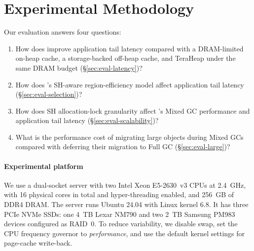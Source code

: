 \section{Experimental Methodology}
\label{chipper:sec:methodology}

Our evaluation answers four questions:

\begin{enumerate}
	\item How does \chipperName{} improve application tail latency compared with a DRAM-limited on-heap cache, a storage-backed off-heap cache, and TeraHeap under the same DRAM budget (\S\ref{sec:eval-latency})?

	\item How does \chipperName{}'s SH-aware region-efficiency model affect application tail latency (\S\ref{sec:eval-selection})?

	\item How does SH allocation-lock granularity affect \chipperName{}'s Mixed GC performance and application tail latency (\S\ref{sec:eval-scalability})?

	\item What is the performance cost of migrating large objects during Mixed GCs compared with deferring their migration to Full GC (\S\ref{sec:eval-large})?

\end{enumerate}

\paragraph{\textbf{Experimental platform}}
We use a dual-socket server with two Intel Xeon E5-2630~v3 CPUs at \SI{2.4}{GHz}, with 16 physical cores in total and hyper-threading enabled, and \SI{256}{GB} of DDR4 DRAM.
The server runs Ubuntu 24.04 with Linux kernel 6.8.
It has three PCIe NVMe SSDs: one \SI{4}{TB} Lexar NM790 and two \SI{2}{TB} Samsung PM983 devices configured as RAID~0.
To reduce variability, we disable swap, set the CPU frequency governor to \emph{performance}, and use the default kernel settings for page-cache write-back.

